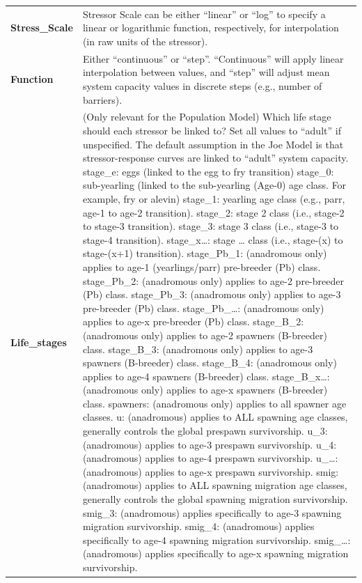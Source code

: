\documentclass[
  letterpaper,
  DIV=11,
  numbers=noendperiod]{scrreprt}
\begin{document}
\begin{longtable}[]{@{}
  >{\raggedright\arraybackslash}p{}
  >{\raggedright\arraybackslash}p{}@{}}
\textbf{Stress\_Scale} & Stressor Scale can be either ``linear'' or
``log'' to specify a linear or logarithmic function, respectively, for
interpolation (in raw units of the stressor). \\
\textbf{Function} & Either ``continuous'' or ``step''. ``Continuous''
will apply linear interpolation between values, and ``step'' will adjust
mean system capacity values in discrete steps (e.g., number of
barriers). \\
\textbf{Life\_stages} & (Only relevant for the Population Model) Which
life stage should each stressor be linked to? Set all values to
``adult'' if unspecified. The default assumption in the Joe Model is
that stressor-response curves are linked to ``adult'' system capacity.
stage\_e: eggs (linked to the egg to fry transition) stage\_0:
sub-yearling (linked to the sub-yearling (Age-0) age class. For example,
fry or alevin) stage\_1: yearling age class (e.g., parr, age-1 to age-2
transition). stage\_2: stage 2 class (i.e., stage-2 to stage-3
transition). stage\_3: stage 3 class (i.e., stage-3 to stage-4
transition). stage\_x\ldots: stage \ldots{} class (i.e., stage-(x) to
stage-(x+1) transition). stage\_Pb\_1: (anadromous only) applies to
age-1 (yearlings/parr) pre-breeder (Pb) class. stage\_Pb\_2: (anadromous
only) applies to age-2 pre-breeder (Pb) class. stage\_Pb\_3: (anadromous
only) applies to age-3 pre-breeder (Pb) class. stage\_Pb\_\ldots:
(anadromous only) applies to age-x pre-breeder (Pb) class. stage\_B\_2:
(anadromous only) applies to age-2 spawners (B-breeder) class.
stage\_B\_3: (anadromous only) applies to age-3 spawners (B-breeder)
class. stage\_B\_4: (anadromous only) applies to age-4 spawners
(B-breeder) class. stage\_B\_x\ldots: (anadromous only) applies to age-x
spawners (B-breeder) class. spawners: (anadromous only) applies to all
spawner age classes. u: (anadromous) applies to ALL spawning age
classes, generally controls the global prespawn survivorship. u\_3:
(anadromous) applies to age-3 prespawn survivorship. u\_4: (anadromous)
applies to age-4 prespawn survivorship. u\_\ldots: (anadromous) applies
to age-x prespawn survivorship. smig: (anadromous) applies to ALL
spawning migration age classes, generally controls the global spawning
migration survivorship. smig\_3: (anadromous) applies specifically to
age-3 spawning migration survivorship. smig\_4: (anadromous) applies
specifically to age-4 spawning migration survivorship. smig\_\ldots:
(anadromous) applies specifically to age-x spawning migration
survivorship. \\
\end{longtable}
\end{document}
